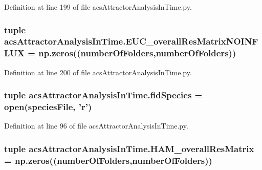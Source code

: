 Definition at line 199 of file acs\-Attractor\-Analysis\-In\-Time.\-py.

\hypertarget{a00091_a4f2ecc559d2c5d79bb138a2e8ced8127}{
\subsubsection[{E\-U\-C\-\_\-overall\-Res\-Matrix\-N\-O\-I\-N\-F\-L\-U\-X}]{\setlength{\rightskip}{0pt plus 5cm}tuple acs\-Attractor\-Analysis\-In\-Time.\-E\-U\-C\-\_\-overall\-Res\-Matrix\-N\-O\-I\-N\-F\-L\-U\-X = np.\-zeros(({\bf number\-Of\-Folders},{\bf number\-Of\-Folders}))}}\label{a00091_a4f2ecc559d2c5d79bb138a2e8ced8127}


Definition at line 200 of file acs\-Attractor\-Analysis\-In\-Time.\-py.

\hypertarget{a00091_a70d70b9ab98e722475b03465c7f8dbbe}{
\subsubsection[{fid\-Species}]{\setlength{\rightskip}{0pt plus 5cm}tuple acs\-Attractor\-Analysis\-In\-Time.\-fid\-Species = open({\bf species\-File}, '{\bf r}')}}\label{a00091_a70d70b9ab98e722475b03465c7f8dbbe}


Definition at line 96 of file acs\-Attractor\-Analysis\-In\-Time.\-py.

\hypertarget{a00091_a5e8d5d65865736555e76c3f04058ddd9}{
\subsubsection[{H\-A\-M\-\_\-overall\-Res\-Matrix}]{\setlength{\rightskip}{0pt plus 5cm}tuple acs\-Attractor\-Analysis\-In\-Time.\-H\-A\-M\-\_\-overall\-Res\-Matrix = np.\-zeros(({\bf number\-Of\-Folders},{\bf number\-Of\-Folders}))}}\label{a00091_a5e8d5d65865736555e76c3f04058ddd9}


